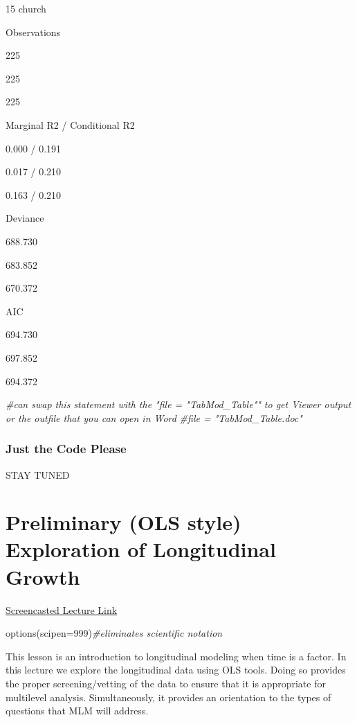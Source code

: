 \documentclass[
  11pt,
]{book}
\newenvironment{Shaded}{\begin{snugshade}}{\end{snugshade}}
\newcommand{\AttributeTok}[1]{\textcolor[rgb]{0.77,0.63,0.00}{#1}}
\newcommand{\CommentTok}[1]{\textcolor[rgb]{0.56,0.35,0.01}{\textit{#1}}}
\newcommand{\DecValTok}[1]{\textcolor[rgb]{0.00,0.00,0.81}{#1}}
\newcommand{\FunctionTok}[1]{\textcolor[rgb]{0.00,0.00,0.00}{#1}}
\newcommand{\NormalTok}[1]{#1}
\begin{document}
15 church

Observations

225

225

225

Marginal R2 / Conditional R2

0.000 / 0.191

0.017 / 0.210

0.163 / 0.210

Deviance

688.730

683.852

670.372

AIC

694.730

697.852

694.372

\begin{Shaded}
\begin{Highlighting}[]
\CommentTok{\#can swap this statement with the "file = "TabMod\_Table"" to get Viewer output or the outfile that you can open in Word}
\CommentTok{\#file = "TabMod\_Table.doc"}
\end{Highlighting}
\end{Shaded}

\hypertarget{just-the-code-please}{%
\subsection{Just the Code Please}\label{just-the-code-please}}

STAY TUNED

\hypertarget{MLMexplore}{%
\chapter{Preliminary (OLS style) Exploration of Longitudinal Growth}\label{MLMexplore}}

\href{https://spu.hosted.panopto.com/Panopto/Pages/Viewer.aspx?pid=36075f1d-b805-40b9-92da-ad2b0053f46c}{Screencasted Lecture Link}

\begin{Shaded}
\begin{Highlighting}[]
\FunctionTok{options}\NormalTok{(}\AttributeTok{scipen=}\DecValTok{999}\NormalTok{)}\CommentTok{\#eliminates scientific notation}
\end{Highlighting}
\end{Shaded}

This lesson is an introduction to longitudinal modeling when time is a factor. In this lecture we explore the longitudinal data using OLS tools. Doing so provides the proper screening/vetting of the data to ensure that it is appropriate for multilevel analysis. Simultaneously, it provides an orientation to the types of questions that MLM will address.
\end{document}
